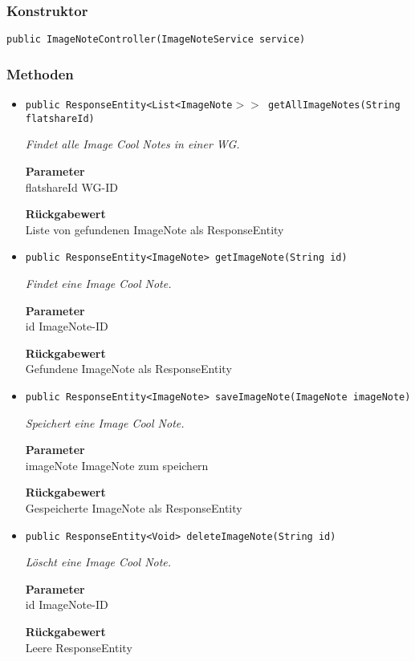    \subsubsection*{Konstruktor}
    \texttt{public ImageNoteController(ImageNoteService service)}
    \subsubsection*{Methoden}
    \begin{itemize}
    	\item{\texttt{public ResponseEntity<List<ImageNote$>>$ getAllImageNotes(String flatshareId)}}
    	
    	\textit{Findet alle Image Cool Notes in einer WG.}
    	
    	\textbf{Parameter} \\
    	flatshareId WG-ID
    	
    	\textbf{Rückgabewert} \\
    	Liste von gefundenen ImageNote als ResponseEntity        \item{\texttt{public ResponseEntity<ImageNote> getImageNote(String id)}}
    	
    	\textit{Findet eine Image Cool Note.}
    	
    	\textbf{Parameter} \\
    	id ImageNote-ID
    	
    	\textbf{Rückgabewert} \\
    	Gefundene ImageNote als ResponseEntity        \item{\texttt{public ResponseEntity<ImageNote> saveImageNote(ImageNote imageNote)}}
    	
    	\textit{Speichert eine Image Cool Note.}
    	
    	\textbf{Parameter} \\
    	imageNote ImageNote zum speichern
    	
    	\textbf{Rückgabewert} \\
    	Gespeicherte ImageNote als ResponseEntity        \item{\texttt{public ResponseEntity<Void> deleteImageNote(String id)}}
    	
    	\textit{Löscht eine Image Cool Note.}
    	
    	\textbf{Parameter} \\
    	id ImageNote-ID
    	
    	\textbf{Rückgabewert} \\
    	Leere ResponseEntity
    \end{itemize}
